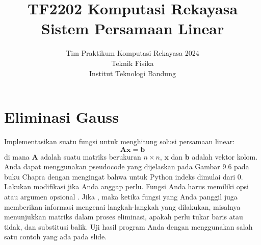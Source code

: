 



\title{%
{\small TF2202 Komputasi Rekayasa}\\
Sistem Persamaan Linear
}
\author{Tim Praktikum Komputasi Rekayasa 2024\\
Teknik Fisika\\
Institut Teknologi Bandung}
\date{}
\maketitle


\section{Eliminasi Gauss}

\begin{soal}
Implementasikan suatu fungsi untuk menghitung solusi persamaan linear:
\begin{equation*}
\mathbf{A}\mathbf{x} = \mathbf{b}
\end{equation*}
di mana $\mathbf{A}$ adalah suatu matriks berukuran $n \times n$, 
$\mathbf{x}$ dan $\mathbf{b}$ adalah vektor kolom.
Anda dapat menggunakan pseudocode yang dijelaskan pada Gambar 9.6
pada buku Chapra dengan mengingat bahwa untuk Python indeks dimulai dari 0.
Lakukan modifikasi jika Anda anggap perlu.
Fungsi Anda harus memiliki opsi atau argumen opsional .
Jika , maka ketika fungsi yang Anda panggil juga
memberikan informasi mengenai langkah-langkah yang dilakukan, misalnya
menunjukkan matriks dalam proses eliminasi, apakah perlu tukar baris atau tidak,
dan substitusi balik. Uji hasil program Anda dengan menggunakan salah satu contoh
yang ada pada slide.
\end{soal}

